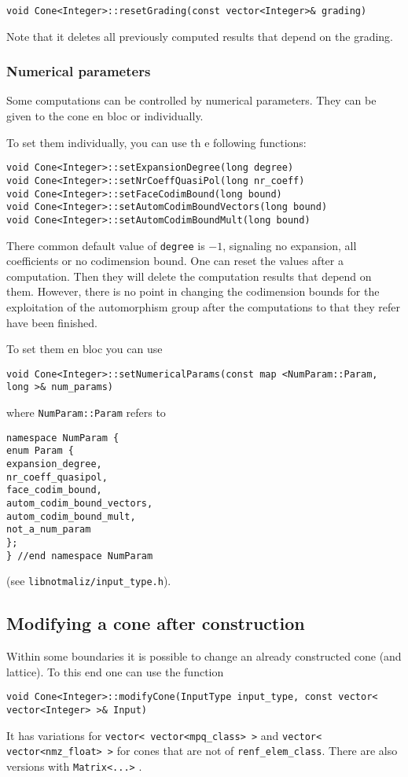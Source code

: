 \documentclass[12pt,a4paper]{scrartcl}
\theoremstyle{definition}
\begin{document}
\begin{small}
\begin{Verbatim}
void Cone<Integer>::resetGrading(const vector<Integer>& grading)
\end{Verbatim}

Note that it deletes all previously computed results that depend on the grading.


\subsubsection{Numerical parameters}

Some computations can be controlled by numerical parameters. They can be given to the cone en bloc or individually.

To set them individually, you can use th e following functions:
\begin{Verbatim}
void Cone<Integer>::setExpansionDegree(long degree)
void Cone<Integer>::setNrCoeffQuasiPol(long nr_coeff)
void Cone<Integer>::setFaceCodimBound(long bound)
void Cone<Integer>::setAutomCodimBoundVectors(long bound)
void Cone<Integer>::setAutomCodimBoundMult(long bound)
\end{Verbatim}
There common default value of \verb|degree| is $-1$, signaling no expansion, all coefficients or no codimension bound. One can reset the values after a computation. Then they will delete the computation results that depend on them. However, there is no point in changing the codimension bounds for the exploitation  of the automorphism group after the computations to that they refer have been finished.

To set them en bloc you can use
\begin{Verbatim}
void Cone<Integer>::setNumericalParams(const map <NumParam::Param, long >& num_params)
\end{Verbatim}
where \verb|NumParam::Param| refers to
\begin{Verbatim}
namespace NumParam {
enum Param {    
expansion_degree,
nr_coeff_quasipol,
face_codim_bound,
autom_codim_bound_vectors,
autom_codim_bound_mult,
not_a_num_param
};
} //end namespace NumParam
\end{Verbatim}
(see \verb|libnotmaliz/input_type.h|).

\subsection{Modifying a cone after construction}\label{Modify}

Within some boundaries it is possible to change an already constructed cone (and lattice). To this end one can use the function
\begin{Verbatim}
void Cone<Integer>::modifyCone(InputType input_type, const vector< vector<Integer> >& Input)
\end{Verbatim}
It has variations for \verb|vector< vector<mpq_class> >| and  \verb|vector< vector<nmz_float> >| for cones that are not of \verb|renf_elem_class|. There are also versions with \verb|Matrix<...>| .


\end{small}
\end{document}
